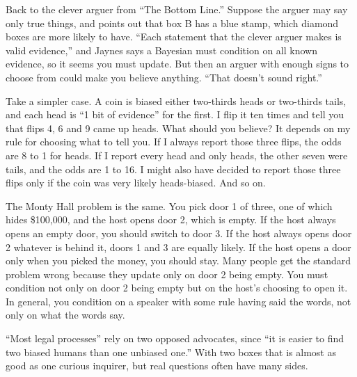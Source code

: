 
Back to the clever arguer from ``The Bottom Line.'' Suppose the arguer may say only true things, and points out that box B has a blue stamp, which diamond boxes are more likely to have. ``Each statement that the clever arguer makes is valid evidence,'' and Jaynes says a Bayesian must condition on all known evidence, so it seems you must update. But then an arguer with enough signs to choose from could make you believe anything. ``That doesn't sound right.'' 

Take a simpler case. A coin is biased either two-thirds heads or two-thirds tails, and each head is ``1 bit of evidence'' for the first.  I flip it ten times and tell you that flips 4, 6 and 9 came up heads. What should you believe? It depends on my rule for choosing what to tell you. If I always report those three flips, the odds are 8 to 1 for heads. If I report every head and only heads, the other seven were tails, and the odds are 1 to 16. I might also have decided to report those three flips only if the coin was very likely heads-biased. And so on.

The Monty Hall problem is the same. You pick door 1 of three, one of which hides \$100,000, and the host opens door 2, which is empty. If the host always opens an empty door, you should switch to door 3. If the host always opens door 2 whatever is behind it, doors 1 and 3 are equally likely. If the host opens a door only when you picked the money, you should stay. Many people get the standard problem wrong because they update only on door 2 being empty. You must condition not only on door 2 being empty but on the host's choosing to open it. In general, you condition on a speaker with some rule having said the words, not only on what the words say. 

``Most legal processes'' rely on two opposed advocates, since ``it is easier to find two biased humans than one unbiased one.'' With two boxes that is almost as good as one curious inquirer, but real questions often have many sides. 

